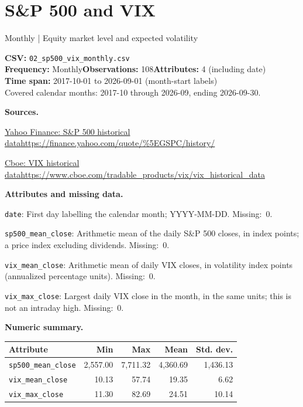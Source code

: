 \documentclass[11pt,a4paper]{article}
\begin{document}
\section{S\&P 500 and VIX}
{\small Monthly | Equity market level and expected volatility}\par
{\small\textbf{CSV:} \texttt{02\_sp500\_vix\_monthly.csv}\\
\textbf{Frequency:} Monthly\quad\textbf{Observations:} 108\quad\textbf{Attributes:} 4 (including date)\\
\textbf{Time span:} 2017-10-01 to 2026-09-01 (month-start labels)\\
Covered calendar months: 2017-10 through 2026-09, ending 2026-09-30.}\par
\textbf{Sources.}\par
{\small\href{https://finance.yahoo.com/quote/\%5EGSPC/history/}{Yahoo Finance: S\&P 500 historical data}\quad\url{https://finance.yahoo.com/quote/\%5EGSPC/history/}}\par
{\small\href{https://www.cboe.com/tradable\_products/vix/vix\_historical\_data}{Cboe: VIX historical data}\quad\url{https://www.cboe.com/tradable_products/vix/vix_historical_data}}\par
\textbf{Attributes and missing data.}\par
{\small\raggedright\texttt{date}: First day labelling the calendar month; YYYY-MM-DD. \mbox{Missing: 0.}\par}
{\small\raggedright\texttt{sp500\_mean\_close}: Arithmetic mean of the daily S\&P 500 closes, in index points; a price index excluding dividends. \mbox{Missing: 0.}\par}
{\small\raggedright\texttt{vix\_mean\_close}: Arithmetic mean of daily VIX closes, in volatility index points (annualized percentage units). \mbox{Missing: 0.}\par}
{\small\raggedright\texttt{vix\_max\_close}: Largest daily VIX close in the month, in the same units; this is not an intraday high. \mbox{Missing: 0.}\par}
\textbf{Numeric summary.}\par
{\footnotesize\setlength{\tabcolsep}{3.5pt}\renewcommand{\arraystretch}{1.25}
\begin{tabular*}{\textwidth}{@{\extracolsep{\fill}}lrrrr@{}}
\toprule Attribute & Min & Max & Mean & Std. dev.\\ \midrule
\texttt{sp500\_mean\_close} & 2,557.00 & 7,711.32 & 4,360.69 & 1,436.13\\
\texttt{vix\_mean\_close} & 10.13 & 57.74 & 19.35 & 6.62\\
\texttt{vix\_max\_close} & 11.30 & 82.69 & 24.51 & 10.14\\
\bottomrule\end{tabular*}}\par
\end{document}
